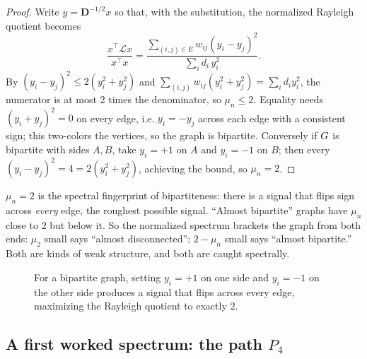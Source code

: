 \begin{proof}
Write $y=\mathbf{D}^{-1/2}x$ so that, with the substitution, the normalized Rayleigh quotient becomes
\[
  \frac{x^\top\mathcal{L}x}{x^\top x}
   = \frac{\sum_{(i,j)\in E} w_{ij}(y_i-y_j)^2}{\sum_i d_i\, y_i^2}.
\]
By $(y_i-y_j)^2\le 2(y_i^2+y_j^2)$ and $\sum_{(i,j)} w_{ij}(y_i^2+y_j^2)=\sum_i d_i y_i^2$, the numerator is at most $2$ times the denominator, so $\mu_n\le 2$. Equality needs $(y_i+y_j)^2=0$ on every edge, i.e. $y_i=-y_j$ across each edge with a consistent sign; this two-colors the vertices, so the graph is bipartite. Conversely if $G$ is bipartite with sides $A,B$, take $y_i=+1$ on $A$ and $y_i=-1$ on $B$; then every $(y_i-y_j)^2=4=2(y_i^2+y_j^2)$, achieving the bound, so $\mu_n=2$.
\end{proof}

\begin{intuitionbox}
$\mu_n=2$ is the spectral fingerprint of bipartiteness: there is a signal that flips sign across \emph{every} edge, the roughest possible signal. ``Almost bipartite'' graphs have $\mu_n$ close to $2$ but below it. So the normalized spectrum brackets the graph from both ends: $\mu_2$ small says ``almost disconnected''; $2-\mu_n$ small says ``almost bipartite.'' Both are kinds of weak structure, and both are caught spectrally.
\end{intuitionbox}

\begin{figure}[htbp]
\centering
{}
\caption{For a bipartite graph, setting $y_i = +1$ on one side and $y_i = -1$ on the other side produces a signal that flips across every edge, maximizing the Rayleigh quotient to exactly $2$.}
\label{ch32:fig-bipartite-signal}
\end{figure}

\subsection{A first worked spectrum: the path $P_4$}
\label{ch32:p4}

